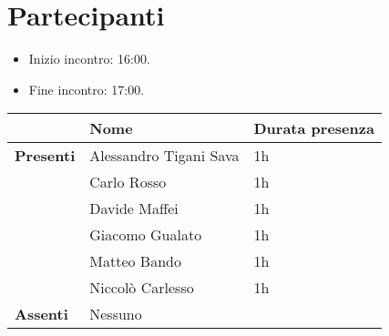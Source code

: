 \section{Partecipanti}

\begin{itemize}
    \item Inizio incontro: 16:00.
    \item Fine incontro: 17:00.
\end{itemize}


\begin{center}
{\renewcommand{\arraystretch}{1.5}
\begin{tabular}{lll}
	                    & \textbf{Nome}  			& \textbf{Durata presenza} \\
	\hline
	\textbf{Presenti}   & Alessandro Tigani Sava	& 1h	\\  
						& Carlo Rosso  				& 1h	\\
						& Davide Maffei          	& 1h	\\ 
						& Giacomo Gualato 			& 1h 	\\
						& Matteo Bando           	& 1h	\\   
						& Niccolò Carlesso 			& 1h 	\\  
	\hline
	\textbf{Assenti}	& Nessuno            		&      	\\
\end{tabular}	
}
\end{center}